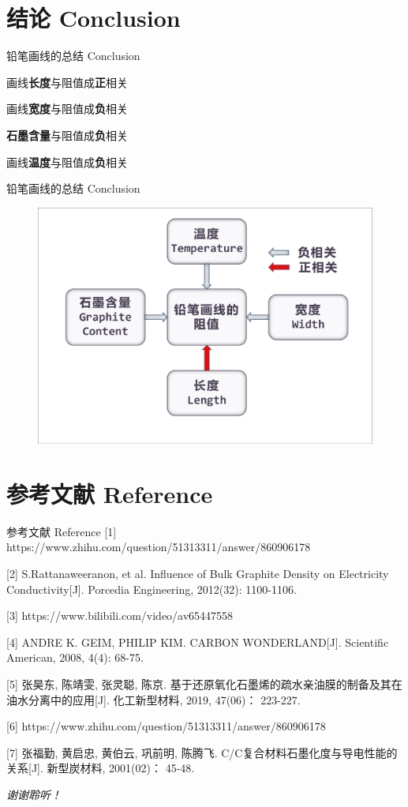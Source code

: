\documentclass[10pt]{beamer}
\begin{document}
	\section[Conclusion]{结论 Conclusion}
	\begin{frame}{铅笔画线的总结 Conclusion}
		\begin{enumerate}
		 {\large \item 画线\textbf{长度}与阻值成\textbf{正}相关
			\item 画线\textbf{宽度}与阻值成\textbf{负}相关
			\item \textbf{石墨含量}与阻值成\textbf{负}相关
			\item 画线\textbf{温度}与阻值成\textbf{负}相关}
		\end{enumerate}
	\end{frame}
	\begin{frame}{铅笔画线的总结 Conclusion}
		\begin{figure}
			\includegraphics[width=0.9\linewidth]{figs/qqq}
		\end{figure}
	\end{frame}
	\section[Reference]{参考文献 Reference}
	
	\begin{frame}{参考文献 Reference}
		[1] https://www.zhihu.com/question/51313311/answer/860906178
		
		[2] S.Rattanaweeranon, et al. Influence of Bulk Graphite Density on Electricity Conductivity[J]. Porcedia Engineering, 2012(32): 1100-1106.
		
		[3] https://www.bilibili.com/video/av65447558
		
		[4] ANDRE K. GEIM, PHILIP KIM. CARBON WONDERLAND[J]. Scientific American, 2008, 4(4): 68-75.
		
		[5] 张昊东, 陈靖雯, 张灵聪, 陈京. 基于还原氧化石墨烯的疏水亲油膜的制备及其在油水分离中的应用[J]. 化工新型材料, 2019, 47(06)： 223-227.
		
		[6] https://www.zhihu.com/question/51313311/answer/860906178
		
		[7] 张福勤, 黄启忠, 黄伯云, 巩前明, 陈腾飞. C/C复合材料石墨化度与导电性能的关系[J]. 新型炭材料, 2001(02)： 45-48.
	\end{frame}
	
	\begin{frame}
		\begin{center}
			\Huge \textit{谢谢聆听！}
		\end{center}
		
	\end{frame}
\end{document}
